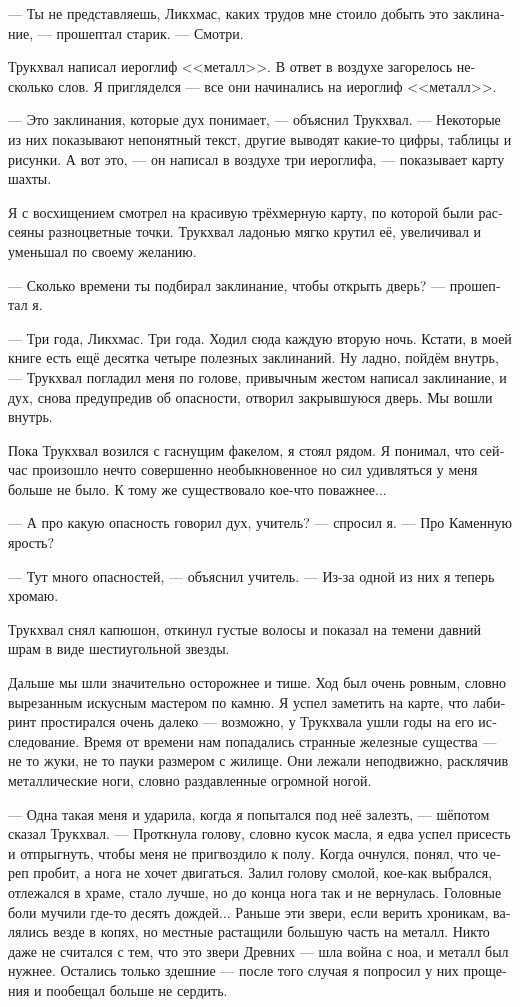\documentclass[a4paper,12pt,fleqn]{book}\usepackage{polyglossia}\setdefaultlanguage[babelshorthands=true]{russian}\setotherlanguage{english}\defaultfontfeatures{Ligatures=TeX,Mapping=tex-text}\usepackage{xcolor}\newcommand{\ml}[3]{#2}
\newcommand{\asterism}{\vspace{1em}{\centering\Large\bfseries$\ast~\ast~\ast$\par}\vspace{1em}}
\begin{document}
{--- Ты не представляешь, Ликхмас, каких трудов мне стоило добыть это заклинание, --- прошептал старик.
--- Смотри.

Трукхвал написал иероглиф <<металл>>.
В ответ в воздухе загорелось несколько слов.
Я пригляделся --- все они начинались на иероглиф <<металл>>.

--- Это заклинания, которые дух понимает, --- объяснил Трукхвал.
--- Некоторые из них показывают непонятный текст, другие выводят какие-то цифры, таблицы и рисунки.
А вот это, --- он написал в воздухе три иероглифа, --- показывает карту шахты.

Я с восхищением смотрел на красивую трёхмерную карту, по которой были рассеяны разноцветные точки.
Трукхвал ладонью мягко крутил её, увеличивал и уменьшал по своему желанию.

--- Сколько времени ты подбирал заклинание, чтобы открыть дверь? --- прошептал я.

--- Три года, Ликхмас.
Три года.
Ходил сюда каждую вторую ночь.
Кстати, в моей книге есть ещё десятка четыре полезных заклинаний.
Ну ладно, пойдём внутрь, --- Трукхвал погладил меня по голове, привычным жестом написал заклинание, и дух, снова предупредив об опасности, отворил закрывшуюся дверь.
Мы вошли внутрь.

Пока Трукхвал возился с гаснущим факелом, я стоял рядом.
Я понимал, что сейчас произошло нечто совершенно необыкновенное но сил удивляться у меня больше не было.
К тому же существовало кое-что поважнее...

--- А про какую опасность говорил дух, учитель? --- спросил я.
--- Про Каменную ярость?

--- Тут много опасностей, --- объяснил учитель.
--- Из-за одной из них я теперь хромаю.

Трукхвал снял капюшон, откинул густые волосы и показал на темени давний шрам в виде шестиугольной звезды.

\asterism

Дальше мы шли значительно осторожнее и тише.
Ход был очень ровным, словно вырезанным искусным мастером по камню.
Я успел заметить на карте, что лабиринт простирался очень далеко --- возможно, у Трукхвала ушли годы на его исследование.
Время от времени нам попадались странные железные существа --- не то жуки, не то пауки размером с жилище.
Они лежали неподвижно, расклячив металлические ноги, словно раздавленные огромной ногой.

--- Одна такая меня и ударила, когда я попытался под неё залезть, --- шёпотом сказал Трукхвал.
--- Проткнула голову, словно кусок масла, я едва успел присесть и отпрыгнуть, чтобы меня не пригвоздило к полу.
Когда очнулся, понял, что череп пробит, а нога не хочет двигаться.
Залил голову смолой, кое-как выбрался, отлежался в храме, стало лучше, но до конца нога так и не вернулась.
Головные боли мучили где-то десять дождей...
Раньше эти звери, если верить хроникам, валялись везде в копях, но местные растащили большую часть на металл.
Никто даже не считался с тем, что это звери Древних --- шла война с ноа, и металл был нужнее.
Остались только здешние --- после того случая я попросил у них прощения и пообещал больше не сердить.

}
\end{document}
